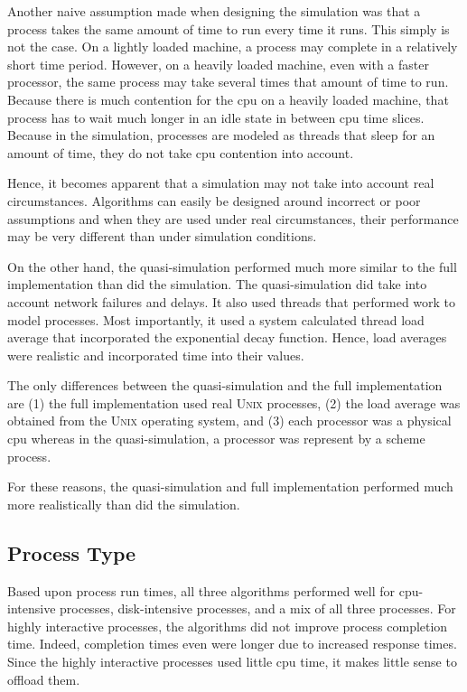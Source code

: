 \documentclass{report}
\newcommand{\UNIX}{\textsc{Unix}\xspace}
\begin{document}
Another naive assumption made when designing the simulation was that a
process takes the same amount of time to run every time it runs.  This
simply is not the case.  On a lightly loaded machine, a process may complete
in a relatively short time period.  However, on a heavily loaded machine,
even with a faster processor, the same process may take several times that
amount of time to run.  Because there is much contention for the cpu on a
heavily loaded machine, that process has to wait much longer in an idle
state in between cpu time slices.  Because in the simulation, processes are
modeled as threads that sleep for an amount of time, they do not take cpu
contention into account.

Hence, it becomes apparent that a simulation may not take into account real
circumstances.  Algorithms can easily be designed around incorrect or poor
assumptions and when they are used under real circumstances, their
performance may be very different than under simulation conditions.

On the other hand, the quasi-simulation performed much more similar to the
full implementation than did the simulation.  The quasi-simulation did take
into account network failures and delays.  It also used threads that
performed work to model processes.  Most importantly, it used a system
calculated thread load average that incorporated the exponential decay
function.  Hence, load averages were realistic and incorporated time into
their values.  

The only differences between the quasi-simulation and the full
implementation are (1) the full implementation used real \UNIX processes,
(2) the load average was obtained from the \UNIX operating system, and (3)
each processor was a physical cpu whereas in the quasi-simulation, a
processor was represent by a scheme process.

For these reasons, the quasi-simulation and full implementation performed
much more realistically than did the simulation.

\subsection{Process Type}

Based upon process run times, all three algorithms performed well for
cpu-intensive processes, disk-intensive processes, and a mix of all three
processes.  For highly interactive processes, the algorithms did not improve
process completion time.  Indeed, completion times even were longer due to
increased response times.  Since the highly interactive processes used
little cpu time, it makes little sense to offload them.
\end{document}

